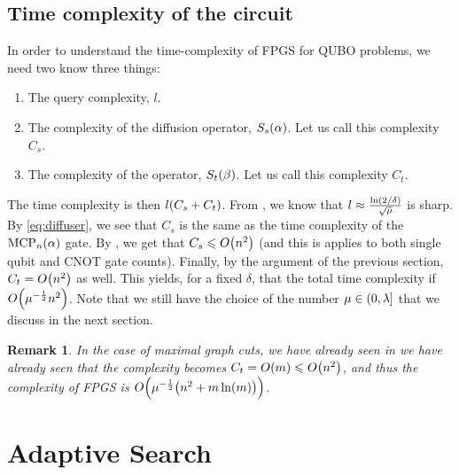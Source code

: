 \documentclass[reqno, 12pt]{amsart}
\numberwithin{equation}{section}                %
\let\originalleft\left
\let\originalright\right
\renewcommand{\left}{\mathopen{}\mathclose\bgroup\originalleft}
\renewcommand{\right}{\aftergroup\egroup\originalright}
\def\({\mathopen{}\left(}
\def\){\right)\mathclose{}}
\newtheorem{remark}[theorem]{Remark}
\begin{document}
\bigskip

\subsection{Time complexity of the circuit}
\label{sec:time}

In order to understand the time-complexity of FPGS for QUBO problems, we need two know three things:
\begin{enumerate}

   \item The query complexity, $l$.

   \item The complexity of the diffusion operator, $S_s \( \alpha \)$. Let us call this complexity $C_s$.

   \item The complexity of the operator, $S_t \( \beta \)$. Let us call this complexity $C_t$.

\end{enumerate}

The time complexity is then $l \( C_s + C_t \)$. From \cite{yoder_fixed_2014}, we know that $l \approx \tfrac{\ln \( 2 / \delta \)}{\sqrt{\mu}}$ is sharp. By \cref{eq:diffuser}, we see that $C_s$ is the same as the time complexity of the $\mathrm{MCP}_n \( \alpha \)$ gate. By \cite{dasilva_linear_2022}, we get that $C_s \leqslant O \( n^2 \)$ (and this is applies to both single qubit and CNOT gate counts). Finally, by the argument of the previous section, $C_t = O \( n^2 \)$ as well. This yields, for a fixed $\delta$, that the total time complexity if $O \( \mu^{- \frac{1}{2}} n^2 \)$. Note that we still have the choice of the number $\mu \in \( 0, \lambda \right]$ that we discuss in the next section.

\begin{remark}
   In the case of maximal graph cuts, we have already seen in  we have already seen that the complexity becomes $C_t = O \( m \) \leqslant O \( n^2 \)$, and thus the complexity of FPGS is $O \( \mu^{- \frac{1}{2}} \( n^2 + m \ln(m) \) \)$.
\end{remark}

\bigskip

\section{Adaptive Search}
\label{sec:adaptive}
\end{document}
